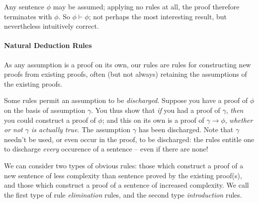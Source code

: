 Any sentence $\phi$ may be assumed; applying no rules at all, the proof therefore terminates with $\phi$. So $\phi\vdash\phi$; not perhaps the most interesting result, but nevertheless intuitively correct.




\paragraph{Natural Deduction Rules}

 As any assumption is a proof on its own, our rules are rules for constructing new proofs from existing proofs, often (but not always) retaining the assumptions of the existing proofs.

Some rules permit an assumption to be \emph{discharged}. Suppose you have a proof of $\phi$ on the basis of assumption $\gamma$.  You thus show that \emph{if} you had a proof of $\gamma$, \emph{then} you could construct a proof of $\phi$; and this on its own is a proof of $\gamma\to\phi$, \emph{whether or not $\gamma$ is actually true}. The assumption $\gamma$ has been discharged.
 Note that $\gamma$ needn't be used, or even occur in the proof, to be discharged: the rules entitle one to discharge \emph{every} occurence of a sentence – even if there are none!

 We can consider two types of obvious rules: those which construct a proof of a new sentence of less complexity than sentence proved by the existing proof(s), and those which construct a proof of a sentence of increased complexity. We call the first type of rule \emph{elimination} rules, and the second type \emph{introduction} rules.




